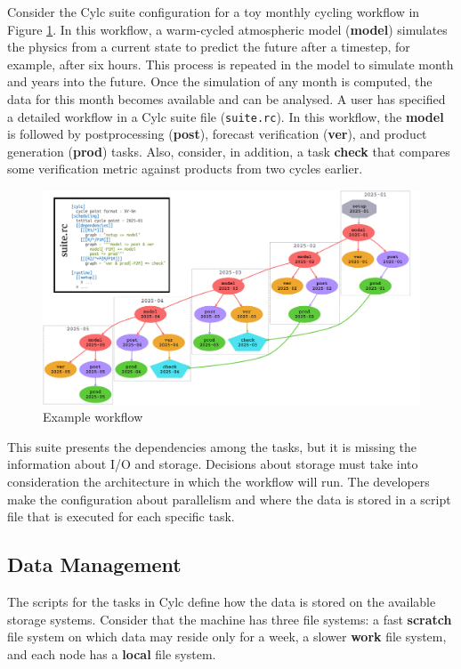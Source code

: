 \documentclass[a4paper]{article}
\begin{document}
Consider the Cylc suite configuration for a toy monthly cycling workflow in Figure \ref{fig:cylc}.
In this workflow, a warm-cycled atmospheric model (\textbf{model}) simulates the physics from a current state to predict the future after a timestep, for example, after six hours.
This process is repeated in the model to simulate month and years into the future.
Once the simulation of any month is computed, the data for this month becomes available and can be analysed.
A user has specified a detailed workflow in a Cylc suite file (\texttt{suite.rc}).
In this workflow, the \textbf{model} is followed by postprocessing (\textbf{post}), forecast verification (\textbf{ver}), and product generation (\textbf{prod}) tasks.
Also, consider, in addition, a task \textbf{check} that compares some verification metric against products from two cycles earlier.

\begin{figure}[H]
  \centering
  \includegraphics[width=0.9\columnwidth]{cylc1.png}
  \caption{Example workflow\cite{8675433}}
  \label{fig:cylc}
\end{figure}

This suite presents the dependencies among the tasks, but it is missing the information about I/O and storage.
Decisions about storage must take into consideration the architecture in which the workflow will run.
The developers make the configuration about parallelism and where the data is stored in a script file that is executed for each specific task.

\subsection{Data Management}
\label{sec:datamanagement}

The scripts for the tasks in Cylc define how the data is stored on the available storage systems.
Consider that the machine has three file systems: a fast \textbf{scratch} file system on which data may reside only for a week, a slower \textbf{work} file system, and each node has a \textbf{local} file system.
\end{document}
